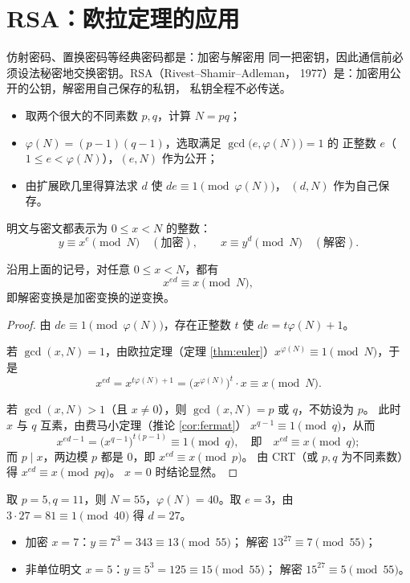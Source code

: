 \section{RSA：欧拉定理的应用}\label{sec:rsa}

仿射密码、置换密码等经典密码都是：加密与解密用
同一把密钥，因此通信前必须设法秘密地交换密钥。RSA（Rivest--Shamir--Adleman，
1977）是：加密用公开的公钥，解密用自己保存的私钥，
私钥全程不必传送。

\begin{itemize}[leftmargin=1.3em,itemsep=1pt]
  \item 取两个很大的不同素数 $p,q$，计算 $N=pq$；
  \item $\varphi(N)=(p-1)(q-1)$，选取满足 $\gcd\bigl(e,\varphi(N)\bigr)=1$ 的
        正整数 $e$（$1\le e<\varphi(N)$），$(e,N)$ 作为公开；
  \item 由扩展欧几里得算法求 $d$ 使 $de\equiv1\pmod{\varphi(N)}$，
        $(d,N)$ 作为自己保存。
\end{itemize}

明文与密文都表示为 $0\le x<N$ 的整数：
\[
  y\equiv x^{e}\pmod N\quad(\text{加密}),\qquad
  x\equiv y^{d}\pmod N\quad(\text{解密}).
\]

\begin{theorem}
沿用上面的记号，对任意 $0\le x<N$，都有
\[
  x^{ed}\equiv x\pmod N,
\]
即解密变换是加密变换的逆变换。
\end{theorem}

\begin{proof}
由 $de\equiv1\pmod{\varphi(N)}$，存在正整数 $t$ 使 $de=t\varphi(N)+1$。

若 $\gcd(x,N)=1$，由欧拉定理（定理 \ref{thm:euler}）$x^{\varphi(N)}\equiv1
\pmod N$，于是
\[
  x^{ed}=x^{t\varphi(N)+1}=\bigl(x^{\varphi(N)}\bigr)^{t}\cdot x\equiv x\pmod N.
\]

若 $\gcd(x,N)>1$（且 $x\ne0$），则 $\gcd(x,N)=p$ 或 $q$，不妨设为 $p$。
此时 $x$ 与 $q$ 互素，由费马小定理（推论 \ref{cor:fermat}）
$x^{q-1}\equiv1\pmod q$，从而
\[
  x^{ed-1}=\bigl(x^{q-1}\bigr)^{t(p-1)}\equiv1\pmod q,
  \quad\text{即}\quad x^{ed}\equiv x\pmod q;
\]
而 $p\mid x$，两边模 $p$ 都是 $0$，即 $x^{ed}\equiv x\pmod p$。
由 CRT（或 $p,q$ 为不同素数）得 $x^{ed}\equiv x\pmod{pq}$。
$x=0$ 时结论显然。
\end{proof}

\begin{example}[一个可手算的例子]
取 $p=5,q=11$，则 $N=55$，$\varphi(N)=40$。取 $e=3$，由
$3\cdot27=81\equiv1\pmod{40}$ 得 $d=27$。
\begin{itemize}[leftmargin=1.3em,itemsep=1pt]
  \item 加密 $x=7$：$y\equiv7^{3}=343\equiv13\pmod{55}$；
        解密 $13^{27}\equiv7\pmod{55}$；
  \item 非单位明文 $x=5$：$y\equiv5^{3}=125\equiv15\pmod{55}$；
        解密 $15^{27}\equiv5\pmod{55}$。
\end{itemize}
\end{example}

